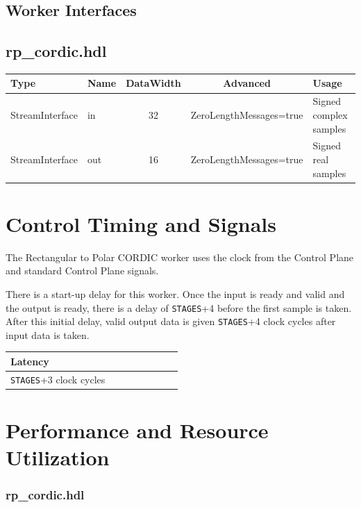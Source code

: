\documentclass{article}
\def\comp{rp\_cordic}
\edef\ecomp{rp_cordic}
\begin{document}
\begin{landscape}
	\section*{Worker Interfaces}
	\subsection*{\comp.hdl}
	\begin{scriptsize}
		\begin{tabular}{|M{2cm}|M{1.5cm}|c|c|M{12cm}|}
			\hline
			Type            & Name & DataWidth & Advanced                & Usage                  \\
			\hline
			StreamInterface & in   & 32        & ZeroLengthMessages=true & Signed complex samples \\
			\hline
			StreamInterface & out  & 16        & ZeroLengthMessages=true & Signed real samples    \\
			\hline
		\end{tabular}
	\end{scriptsize}
\end{landscape}

\section*{Control Timing and Signals}
The Rectangular to Polar CORDIC worker uses the clock from the Control Plane and standard Control Plane signals.

\noindent There is a start-up delay for this worker. Once the input is ready and valid and the output is ready, there is a delay of \verb+STAGES++4 before the first sample is taken. After this initial delay, valid output data is given \verb+STAGES++4 clock cycles after input data is taken.\medskip

\begin{tabular}{|M{4.5cm}|M{1cm}|M{1cm}|M{1.5cm}|M{2cm}|M{1cm}|M{1cm}|M{2.5cm}|}
	\hline
	Latency                      \\
	\hline
	\verb+STAGES++3 clock cycles \\
	\hline
\end{tabular}

\section*{Performance and Resource Utilization}
\subsubsection*{\comp.hdl}

\end{document}

